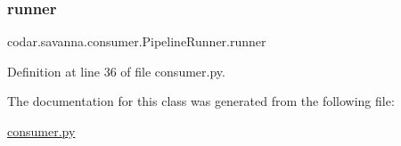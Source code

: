 \subsubsection{\texorpdfstring{runner}{runner}}
{\footnotesize\ttfamily codar.\+savanna.\+consumer.\+Pipeline\+Runner.\+runner}



Definition at line 36 of file consumer.\+py.



The documentation for this class was generated from the following file\+:\begin{DoxyCompactItemize}
\item 
\hyperlink{consumer_8py}{consumer.\+py}\end{DoxyCompactItemize}
